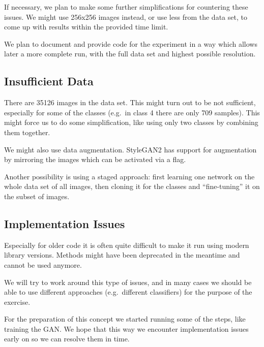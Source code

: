 \documentclass[sigconf,nonacm]{acmart}
\begin{document}
If necessary, we plan to make some further simplifications for
countering these issues.
We might use 256x256 images instead, or use less from the data set,
to come up with results within the provided time limit.

We plan to document and provide code for the experiment in a way
which allows later a more complete run, with the full data set
and highest possible resolution.

\subsection{Insufficient Data}

There are \SI{35126}{} images in the data set.
This might turn out to be not
sufficient, especially for some of the classes (e.g.\ in class 4
there are only 709 samples).
This might force us to do some simplification, like using only two
classes by combining them together.

We might also use data augmentation. StyleGAN2 has support for
augmentation by mirroring the images which can be activated
via a flag.

Another possibility is using a staged approach: first learning
one network on the whole data set of all images, then
cloning it for the classes and ``fine-tuning'' it on the subset
of images.

\subsection{Implementation Issues}

Especially for older code it is often quite difficult to
make it run using modern library versions.
Methods might have been deprecated in the meantime and cannot
be used anymore.

We will try to work around this type of issues, and in many cases
we should be able to use different approaches (e.g.\ different
classifiers) for the purpose of the exercise.

For the preparation of this concept we started running some
of the steps, like training the GAN.
We hope that this way we encounter implementation issues early on
so we can resolve them in time.



\end{document}
